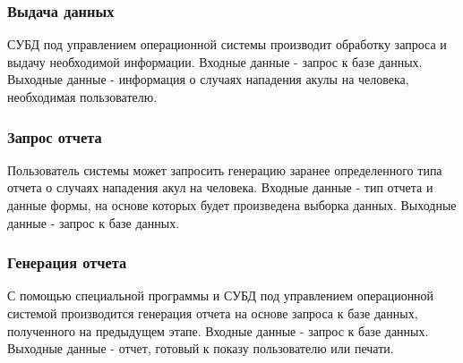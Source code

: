 \documentclass[russian,utf8,simple,emptystyle]{eskdtext}
\begin{document}
\subsubsection{Выдача данных}
СУБД под управлением операционной системы производит обработку запроса и выдачу необходимой информации. Входные данные - запрос к базе данных. Выходные данные - информация о случаях нападения акулы на человека, необходимая пользователю.

\subsubsection{Запрос отчета}
Пользователь системы может запросить генерацию заранее определенного типа отчета о случаях нападения акул на человека. Входные данные - тип отчета и данные формы, на основе которых будет произведена выборка данных. Выходные данные - запрос к базе данных.

\subsubsection{Генерация отчета}
С помощью специальной программы и СУБД под управлением операционной системой производится генерация отчета на основе запроса к базе данных, полученного на предыдущем этапе. Входные данные - запрос к базе данных. Выходные данные - отчет, готовый к показу пользователю или печати.
\end{document}
